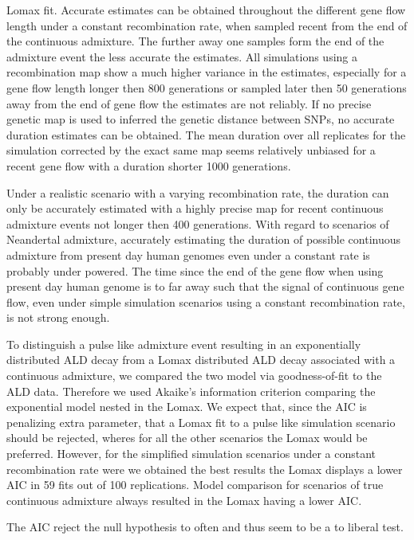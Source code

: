 \documentclass[]{article}
\begin{document}
Lomax fit. Accurate estimates can be obtained throughout the different
gene flow length under a constant recombination rate, when sampled
recent from the end of the continuous admixture. The further away one
samples form the end of the admixture event the less accurate the
estimates. All simulations using a recombination map show a much higher
variance in the estimates, especially for a gene flow length longer then
800 generations or sampled later then 50 generations away from the end
of gene flow the estimates are not reliably. If no precise genetic map
is used to inferred the genetic distance between SNPs, no accurate
duration estimates can be obtained. The mean duration over all
replicates for the simulation corrected by the exact same map seems
relatively unbiased for a recent gene flow with a duration shorter 1000
generations. 

Under a realistic scenario with a varying recombination
rate, the duration can only be accurately estimated with a highly
precise map for recent continuous admixture events not longer then 400
generations. With regard to scenarios of Neandertal admixture,
accurately estimating the duration of possible continuous admixture from
present day human genomes even under a constant rate is probably
under powered. The time since the end of the gene flow when using
present day human genome is to far away such that the signal of
continuous gene flow, even under simple simulation scenarios using a
constant recombination rate, is not strong enough.

To distinguish a pulse like admixture event resulting in an
exponentially distributed ALD decay from a Lomax distributed ALD decay
associated with a continuous admixture, we compared the two model via
goodness-of-fit to the ALD data. Therefore we used Akaike's information
criterion comparing the exponential model nested in the Lomax. We expect
that, since the AIC is penalizing extra parameter, that a Lomax fit to a
pulse like simulation scenario should be rejected, wheres for all the
other scenarios the Lomax would be preferred. However, for the
simplified simulation scenarios under a constant recombination rate were
we obtained the best results the Lomax displays a lower AIC in 59 fits
out of 100 replications. Model comparison for scenarios of true
continuous admixture always resulted in the Lomax having a lower AIC.

The
AIC reject the null hypothesis to often and thus seem to be a to liberal
test.
\end{document}
